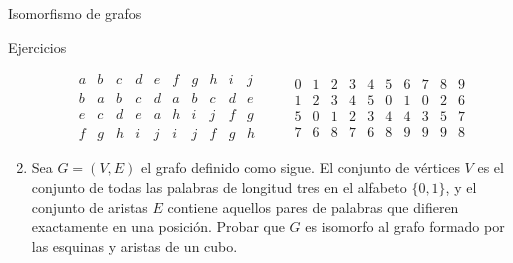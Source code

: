 \documentclass[11pt,spanish,makeidx]{amsbook}
\theoremstyle{definition}
\theoremstyle{remark}
\begin{document}
\begin{section}{Isomorfismo de grafos}
\begin{subsection}{Ejercicios}
\begin{enumerate}
$$
\begin{matrix}
a&b&c&d&e&f&g&h&i&j\\ \hline
b&a&b&c&d&a&b&c&d&e\\
e&c&d&e&a&h&i&j&f&g\\
f&g&h&i&j&i&j&f&g&h
\end{matrix}
\qquad \begin{matrix}
0&1&2&3&4&5&6&7&8&9\\ \hline
1&2&3&4&5&0&1&0&2&6\\
5&0&1&2&3&4&4&3&5&7\\
7&6&8&7&6&8&9&9&9&8
\end{matrix}
$$

\item Sea $G=(V,E)$ el grafo definido como sigue. El conjunto de vértices $V$ es el conjunto de todas las palabras de longitud tres en el alfabeto $\{0,1\}$, y el conjunto de aristas $E$ contiene aquellos pares de palabras que difieren exactamente en una posición. Probar que $G$ es isomorfo al grafo formado por las esquinas y aristas de un cubo.
\end{enumerate}
\end{subsection}

\end{section}
\end{document}
